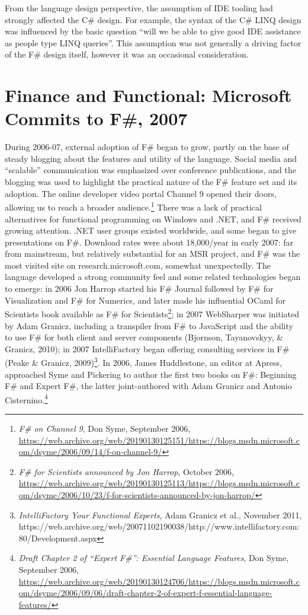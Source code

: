 \documentclass[acmsmall]{acmart}\settopmatter{}
\begin{document}
From the language design perspective, the assumption of IDE tooling had strongly affected the C\# design.  For
example, the syntax of the C\# LINQ design was influenced by the basic question “will we be able to give good
IDE assistance as people type LINQ queries”.  This assumption was not generally a driving factor of the F\# design itself, however it was an occasional consideration.



\section*{Finance and Functional: Microsoft Commits to F\#, 2007}

During 2006-07, external adoption of F\# began to grow, partly on the base of steady blogging about the features and utility of the language.
Social media and “scalable” communication was emphasized over conference publications, and the blogging was used to highlight the practical
nature of the F\# feature set and its adoption. The online developer video portal Channel 9 opened their doors, allowing us to reach a broader
audience.\footnote{\textit{F\# on Channel 9}, Don Syme, September 2006, \url{https://web.archive.org/web/20190130125151/https://blogs.msdn.microsoft.com/dsyme/2006/09/14/f-on-channel-9/}}
There was a lack of practical alternatives for functional programming on Windows and .NET, and F\# received growing attention.
.NET user groups existed worldwide, and some began to give presentations on F\#. Download rates were about 18,000/year in early 2007:
far from mainstream, but relatively substantial for an MSR project, and F\# was the most visited site on research.microsoft.com, somewhat
unexpectedly. The language developed a strong community feel and some related technologies began to emerge: in 2006 Jon Harrop started
his F\# Journal followed by F\# for Visualization and F\# for Numerics, and later made his influential OCaml for Scientists book available
as F\# for Scientists\footnote{ \textit{F\# for Scientists announced by Jon Harrop}, October 2006, \url{https://web.archive.org/web/20190130125113/https://blogs.msdn.microsoft.com/dsyme/2006/10/23/f-for-scientists-announced-by-jon-harrop/}}; in 2007 WebSharper was initiated by Adam Granicz, including a
transpiler from F\# to JavaScript and the ability to use F\# for both client and server
components (Bjornson, Tayanovskyy, \& Granicz, 2010); in 2007 IntelliFactory began offering consulting services
in F\# (Peake \& Granicz, 2009)\footnote{\textit{IntelliFactory Your Functional Experts}, Adam Granicz et al., November 2011, https://web.archive.org/web/20071102190038/http://www.intellifactory.com:80/Development.aspx}.
In 2006, James Huddlestone, an editor at Apress, approached Syme and Pickering to author the first two
books on F\#: Beginning F\# and Expert F\#, the latter joint-authored with Adam Granicz and Antonio Cisternino.\footnote{\textit{Draft Chapter 2 of ``Expert F\#'': Essential Language Features}, Don Syme, September 2006, \url{https://web.archive.org/web/20190130124706/https://blogs.msdn.microsoft.com/dsyme/2006/09/06/draft-chapter-2-of-expert-f-essential-language-features/}}
\end{document}
